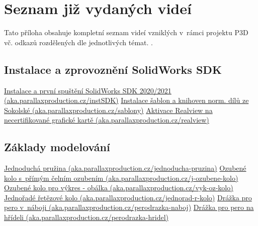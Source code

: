\chapter{Seznam již vydaných videí} \label{released-videos}
Tato příloha obsahuje kompletní seznam videí vzniklých v~rámci projektu P3D vč. odkazů rozdělených dle jednotlivých témat. \newline
\noindent{}.

\section{Instalace a zprovoznění SolidWorks SDK} \label{videa-instalace}
\href{https://aka.parallaxproduction.cz/instalaceSDK}{Instalace a první spuštění SolidWorks SDK 2020/2021 (aka.parallaxproduction.cz/instSDK)} \newline
\href{https://aka.parallaxproduction.cz/sablony}{Instalace šablon a knihoven norm. dílů ze Sokolské (aka.parallaxproduction.cz/sablony)} \newline
\href{https://aka.parallaxproduction.cz/realview}{Aktivace Realview na necertifikované grafické kartě (aka.parallaxproduction.cz/realview)} \newline

\section{Základy modelování} \label{videa-modelovani}
\href{https://aka.parallaxproduction.cz/jednoducha-pruzina}{Jednoduchá pružina (aka.parallaxproduction.cz/jednoducha-pruzina)} \newline
\href{https://aka.parallaxproduction.cz/j-ozubene-kolo}{Ozubené kolo s~přímým čelním ozubením (aka.parallaxproduction.cz/j-ozubene-kolo)} \newline
\href{https://aka.parallaxproduction.cz/vyk-oz-kolo}{Ozubené kolo pro výkres - obálka (aka.parallaxproduction.cz/vyk-oz-kolo)} \newline
\href{https://aka.parallaxproduction.cz/jednorad-r-kolo}{Jednořadé řetězové kolo (aka.parallaxproduction.cz/jednorad-r-kolo)} \newline
\href{https://aka.parallaxproduction.cz/perodrazka-naboj}{Drážka pro pero v~náboji (aka.parallaxproduction.cz/perodrazka-naboj)} \newline
\href{https://aka.parallaxproduction.cz/perodrazka-hridel}{Drážka pro pero na hřídeli (aka.parallaxproduction.cz/perodrazka-hridel)} \newline

